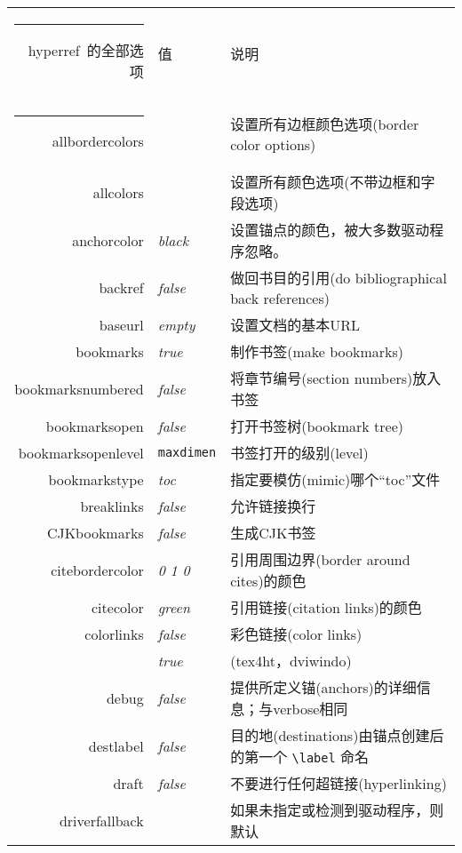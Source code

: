 \documentclass{article}
\makeatletter
\newcommand{\bs}{\symbol{'134}}%
\newcommand{\ci}[1]{\texttt{\bs#1}}
\newcommand{\Heiti}{\CJKfamily{Heiti}} %
\def\hlinew#1{%
\noalign{\ifnum0=`}\fi\hrule \@height #1 \futurelet
\reserved@a\@xhline}
\makeatother
\begin{document}
\begin{longtable}{@{}>{\ttfamily}rlp{7cm}@{}}
\hlinew{1.0pt}
\endlastfoot
{\Heiti \textsf{hyperref}\ 的全部选项}&{\Heiti 值}& {\Heiti 说明} \\
\hlinew{0.7pt}
allbordercolors    &                        & 设置所有边框颜色选项(border color options)\\
allcolors          &                        & 设置所有颜色选项(不带边框和字段选项)\\
anchorcolor        & \textit{black}         & 设置锚点的颜色，被大多数驱动程序忽略。 \\
backref            & \textit{false}         & 做回书目的引用(do bibliographical back references) \\
baseurl            & \textit{empty}         & 设置文档的基本URL \\
bookmarks          & \textit{true}          & 制作书签(make bookmarks) \\
bookmarksnumbered  & \textit{false}         & 将章节编号(section numbers)放入书签\\
bookmarksopen      & \textit{false}         & 打开书签树(bookmark tree)\\
bookmarksopenlevel & \ttfamily\ci{maxdimen} & 书签打开的级别(level) \\
bookmarkstype      & \textit{toc}           & 指定要模仿(mimic)哪个“toc”文件\\
breaklinks         & \textit{false}         & 允许链接换行 \\
CJKbookmarks       & \textit{false}         & 生成CJK书签\\
citebordercolor    & \textit{0 1 0}         & 引用周围边界(border around cites)的颜色\\
citecolor          & \textit{green}         & 引用链接(citation links)的颜色\\
colorlinks         & \textit{false}         & 彩色链接(color links) \\
                   & \textit{true}          & (\textsf{tex4ht}，\textsf{dviwindo}) \\
debug              & \textit{false}         & 提供所定义锚(anchors)的详细信息；与verbose相同\\
destlabel          & \textit{false}         & 目的地(destinations)由锚点创建后的第一个 \verb|\label| 命名\\
draft              & \textit{false}         & 不要进行任何超链接(hyperlinking)\\
driverfallback     &                        & 如果未指定或检测到驱动程序，则默认\\

\end{longtable}
\end{document}
